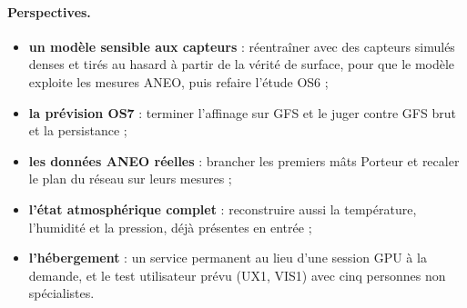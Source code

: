\paragraph{Perspectives.}
\begin{itemize}
  \item \textbf{un modèle sensible aux capteurs} : réentraîner avec des capteurs simulés denses et
        tirés au hasard à partir de la vérité de surface, pour que le modèle exploite les mesures
        ANEO, puis refaire l'étude OS6 ;
  \item \textbf{la prévision OS7} : terminer l'affinage sur GFS et le juger contre GFS brut et la
        persistance ;
  \item \textbf{les données ANEO réelles} : brancher les premiers mâts Porteur et recaler le plan
        du réseau sur leurs mesures ;
  \item \textbf{l'état atmosphérique complet} : reconstruire aussi la température, l'humidité et la
        pression, déjà présentes en entrée ;
  \item \textbf{l'hébergement} : un service permanent au lieu d'une session GPU à la demande, et le
        test utilisateur prévu (UX1, VIS1) avec cinq personnes non spécialistes.
\end{itemize}
